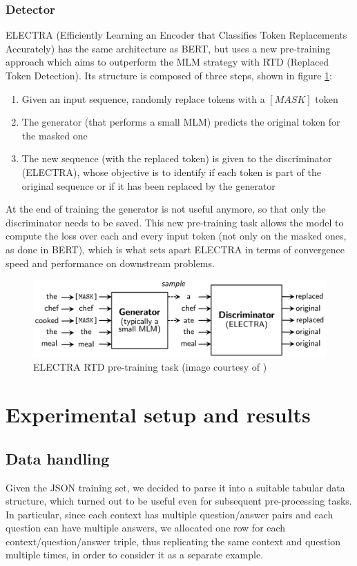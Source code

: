 \documentclass[a4paper,10pt]{report}
\begin{document}
\subsection{Detector}\label{subsec:electra-model}
ELECTRA (Efficiently Learning an Encoder that Classifies Token Replacements Accurately) \cite{electra} has the same architecture as BERT, but uses a new pre-training approach which aims to outperform the MLM strategy with RTD (Replaced Token Detection). Its structure is composed of three steps, shown in figure \ref{fig:electra}:
\begin{enumerate}
  \item Given an input sequence, randomly replace tokens with a $[MASK]$ token
  \item The generator (that performs a small MLM) predicts the original token for the masked one
  \item The new sequence (with the replaced token) is given to the discriminator (ELECTRA), whose objective is to identify if each token is part of the original sequence or if it has been replaced by the generator
\end{enumerate}
At the end of training the generator is not useful anymore, so that only the discriminator needs to be saved.
This new pre-training task allows the model to compute the loss over each and every input token (not only on the masked ones, as done in BERT), which is what sets apart ELECTRA in terms of convergence speed and performance on downstream problems.

\begin{figure}[h]
  \center
  \includegraphics[width=0.85\linewidth]{electra-pretraining}
  \caption{ELECTRA RTD pre-training task (image courtesy of \cite{electra})}
  \label{fig:electra}
\end{figure}


\chapter{Experimental setup and results}\label{chap:experiments}
 
\section{Data handling}\label{sec:data-handling}
Given the JSON training set, we decided to parse it into a suitable tabular data structure, which turned out to be useful even for subsequent pre-processing tasks. In particular, since each context has multiple question/answer pairs and each question can have multiple answers, we allocated one row for each context/question/answer triple, thus replicating the same context and question multiple times, in order to consider it as a separate example.
\end{document}
